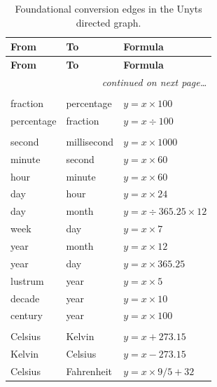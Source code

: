 \documentclass[11pt,a4paper]{report}
\begin{document}
\medskip
\renewcommand{\arraystretch}{1.15}
{\small
\begin{longtable}{l l l}
\caption{Foundational conversion edges in the Unyts directed graph.}
\label{tab:conversions} \\
\toprule
\textbf{From} & \textbf{To} & \textbf{Formula} \\
\midrule
\endfirsthead
\toprule
\textbf{From} & \textbf{To} & \textbf{Formula} \\
\midrule
\endhead
\midrule
\multicolumn{3}{r}{\textit{continued on next page\dots}} \\
\bottomrule
\endfoot
\bottomrule
\endlastfoot
\multicolumn{3}{l}{\textbf{Percentage \& Fraction}} \\
\midrule
fraction          & percentage        & $y = x \times 100$ \\
percentage        & fraction          & $y = x \div 100$ \\
\addlinespace
\multicolumn{3}{l}{\textbf{Time}} \\
\midrule
second            & millisecond       & $y = x \times 1000$ \\
minute            & second            & $y = x \times 60$ \\
hour              & minute            & $y = x \times 60$ \\
day               & hour              & $y = x \times 24$ \\
day               & month             & $y = x \div 365.25 \times 12$ \\
week              & day               & $y = x \times 7$ \\
year              & month             & $y = x \times 12$ \\
year              & day               & $y = x \times 365.25$ \\
lustrum           & year              & $y = x \times 5$ \\
decade            & year              & $y = x \times 10$ \\
century           & year              & $y = x \times 100$ \\
\addlinespace
\multicolumn{3}{l}{\textbf{Temperature}} \\
\midrule
Celsius           & Kelvin            & $y = x + 273.15$ \\
Kelvin            & Celsius           & $y = x - 273.15$ \\
Celsius           & Fahrenheit        & $y = x \times 9/5 + 32$ \\

\end{longtable}}
\end{document}
